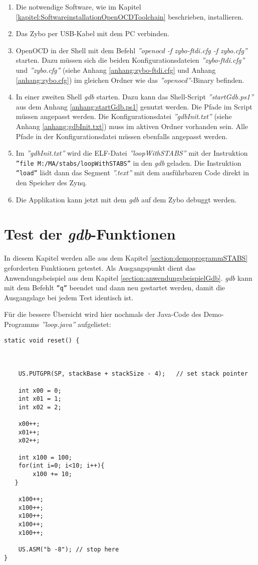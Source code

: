 \begin{enumerate}
	\item Die notwendige Software, wie im Kapitel \ref{kapitel:SoftwareinstallationOpenOCDToolchain} beschrieben, installieren.
	\item Das Zybo per USB-Kabel mit dem PC verbinden.
	\item OpenOCD in der Shell mit dem Befehl \textit{''openocd -f zybo-ftdi.cfg -f zybo.cfg''} starten.
	       Dazu müssen sich die beiden Konfigurationsdateien \textit{''zybo-ftdi.cfg''} und \textit{''zybo.cfg''} (siehe Anhang \ref{anhang:zybo-ftdi.cfg} und Anhang \ref{anhang:zybo.cfg}) im gleichen Ordner wie das \textit{''openocd''}-Binary befinden.
	\item In einer zweiten Shell \textit{gdb} starten.
	       Dazu kann das Shell-Script \textit{''startGdb.ps1''} aus dem Anhang \ref{anhang:startGdb.ps1} genutzt werden.
	       Die Pfade im Script müssen angepasst werden.
	       Die Konfigurationsdatei \textit{''gdbInit.txt''} (siehe Anhang \ref{anhang:gdbInit.txt}) muss im aktiven Ordner vorhanden sein.
	       Alle Pfade in der Konfigurationsdatei müssen ebenfalls angepasst werden.
	\item Im \textit{''gdbInit.txt''} wird die ELF-Datei \textit{''loopWithSTABS''} mit der Instruktion \texttt{''file M:/MA/stabs/loopWithSTABS''} in den \textit{gdb} geladen. Die Instruktion \texttt{''load''} lädt dann das Segment \textit{''.text''} mit dem ausführbaren Code direkt in den Speicher des Zynq.
	\item Die Applikation kann jetzt mit dem \textit{gdb} auf dem Zybo debuggt werden.
\end{enumerate}


\section{Test der \textit{gdb}-Funktionen}
In diesem Kapitel werden alle aus dem Kapitel \ref{section:demoprogrammSTABS} geforderten Funktionen getestet.
Als Ausgangspunkt dient das Anwendungsbeispiel aus dem Kapitel \ref{section:anwendungsbeispielGdb}.
\textit{gdb} kann mit dem Befehlt \texttt{''q''} beendet und dann neu gestartet werden, damit die Ausgangslage bei jedem Test identisch ist.


Für die bessere Übersicht wird hier nochmals der Java-Code des Demo-Programms \textit{''loop.java''} aufgelistet:
\lstset{language=java}
\begin{lstlisting}
static void reset() {



	US.PUTGPR(SP, stackBase + stackSize - 4);	// set stack pointer
	
	int x00 = 0;
	int x01 = 1;
	int x02 = 2;
	
	x00++;
	x01++;
	x02++;
	
	int x100 = 100;
	for(int i=0; i<10; i++){
		x100 += 10;
   }
		
	x100++;
	x100++;
	x100++;
	x100++;
	x100++;

	US.ASM("b -8"); // stop here
}
\end{lstlisting}


